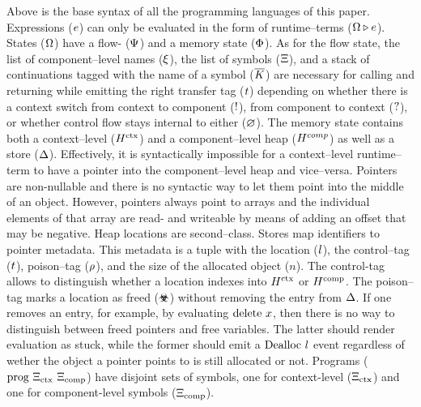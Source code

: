\documentclass[utf8,acmsmall,review,screen,dvipsnames]{acmart}
\begin{document}
Above is the base syntax of all the programming languages of this paper.
Expressions ($\expr$) can only be evaluated in the form of runtime--terms ($\rtt{\statevar}{\expr}$).
States ($\statevar$) have a flow- ($\cfstate$) and a memory state ($\memstate$).
As for the flow state, the list of component--level names ($\commlib$), the list of symbols ($\library$), and a stack of continuations tagged with the name of a symbol ($\ectxstack$) are necessary for calling and returning while emitting the right transfer tag ($\sandboxtag$) depending on whether there is a context switch from context to component ($\comptoctx$), from component to context ($\ctxtocomp$), or whether control flow stays internal to either ($\nocomm$).
The memory state contains both a context--level ($\heap[^{\ctx}]$) and a component--level heap ($\heap[^{comp}]$) as well as a store ($\store$).
Effectively, it is syntactically impossible for a context--level runtime--term to have a pointer into the component--level heap and vice--versa.
Pointers are non-nullable and there is no syntactic way to let them point into the middle of an object.
However, pointers always point to arrays and the individual elements of that array are read- and writeable by means of adding an offset that may be negative.
Heap locations are second--class. %
Stores map identifiers to pointer metadata.
This metadata is a tuple with the location ($\loc$), the control--tag ($\sandboxtag$), poison--tag ($\poison$), and the size of the allocated object ($n$).
The control-tag allows to distinguish whether a location indexes into $\heap[^{\ctx}]$ or $\heap[^{\comp}]$.
The poison--tag marks a location as freed ($\poisoned$) without removing the entry from $\store$.
If one removes an entry, for example, by evaluating $\ldelete{x}$, then there is no way to distinguish between freed pointers and free variables.
The latter should render evaluation as stuck, while the former should emit a $\ev{Dealloc}\ \loc$ event regardless of wether the object a pointer points to is still allocated or not.
Programs ($\prog{\library_{\ctx}}{\library_{\comp}}$) have disjoint sets of symbols, one for context-level ($\library_{\ctx}$) and one for component-level symbols ($\library_{\comp}$).
\end{document}
